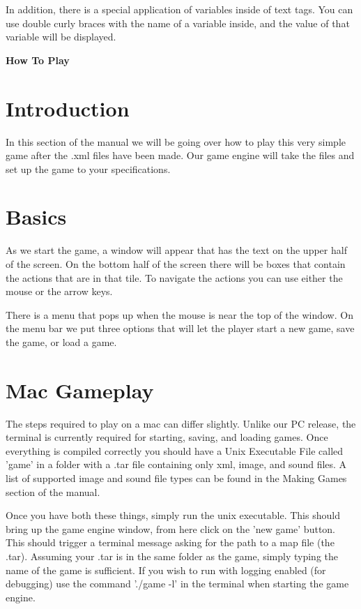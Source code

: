 \documentclass[11pt]{article}
\begin{document}
In addition, there is a special application of variables inside of text tags. You can use double curly braces with the name of a variable inside, and the value of that variable will be displayed. 


\begin{center}\huge \bf How To Play 
\end{center}

\section{Introduction}

In this section of the manual we will be going over how to play this very simple game after the .xml files have been made. Our game engine will take the files and set up the game to your specifications. 

\section{Basics}

As we start the game, a window will appear that has the text on the upper half of the screen. On the bottom half of the screen there will be boxes that contain the actions that are in that tile. To navigate the actions you can use either the mouse or the arrow keys.

There is a menu that pops up when the mouse is near the top of the window. On the menu bar we put three options that will let the player start a new game, save the game, or load a game.

\section{Mac Gameplay}

The steps required to play on a mac can differ slightly. Unlike our PC release, the terminal is currently required for starting, saving, and loading games. Once everything is compiled correctly you should have a Unix Executable File called 'game' in a folder with a .tar file containing only xml, image, and sound files. A list of supported image and sound file types can be found in the Making Games section of the manual. 

Once you have both these things, simply run the unix executable. This should bring up the game engine window, from here click on the 'new game' button. This should trigger a terminal message asking for the path to a map file (the .tar). Assuming your .tar is in the same folder as the game, simply typing the name of the game is sufficient. If you wish to run with logging enabled (for debugging) use the command './game -l' in the terminal when starting the game engine. 
\end{document}

